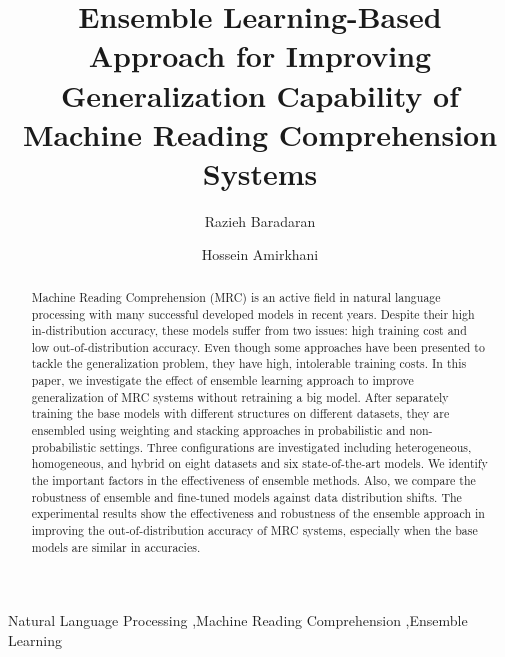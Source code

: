\documentclass[review]{elsarticle}
\begin{document}
\begin{frontmatter}
\title{Ensemble Learning-Based Approach for Improving Generalization Capability of Machine Reading Comprehension Systems}


\author[QOMaddress]{Razieh Baradaran}

\author[QOMaddress]{Hossein Amirkhani}

\address[QOMaddress]{Department of Computer Engineering and Information Technology, University of Qom, Iran}






\begin{abstract}
Machine Reading Comprehension (MRC) is an active field in natural language processing with many successful developed models in recent years. Despite their high in-distribution accuracy, these models suffer from two issues: high training cost and low out-of-distribution accuracy. Even though some approaches have been presented to tackle the generalization problem, they have high, intolerable training costs. In this paper, we investigate the effect of ensemble learning approach to improve generalization of MRC systems without retraining a big model. After separately training the base models with different structures on different datasets, they are ensembled using weighting and stacking approaches in probabilistic and non-probabilistic settings. Three configurations are investigated including heterogeneous, homogeneous, and hybrid on eight datasets and six state-of-the-art models. We identify the important factors in the effectiveness of ensemble methods.
Also, we compare the robustness of ensemble and fine-tuned models against data distribution shifts. The experimental results show the effectiveness and robustness of the ensemble approach in improving the out-of-distribution accuracy of MRC systems, especially when the base models are similar in accuracies.
\end{abstract}

\begin{keyword}
Natural Language Processing \sep Machine Reading Comprehension \sep Ensemble Learning
\end{keyword}

\end{frontmatter}
\end{document}
